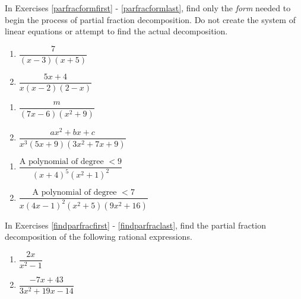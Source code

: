 \label{ExercisesforParFrac}

In Exercises \ref{parfracformfirst} - \ref{parfracformlast},  find only the \emph{form} needed to begin the process of partial fraction decomposition.  Do not create the system of linear equations or attempt to find the actual decomposition.

\begin{multicols}{2}
\begin{enumerate}

\item $\dfrac{7}{(x - 3)(x + 5)}$ \label{parfracformfirst}
\item $\dfrac{5x + 4}{x(x - 2)(2 - x)}$

\setcounter{HW}{\value{enumi}}
\end{enumerate}
\end{multicols}

\begin{multicols}{2}
\begin{enumerate}
\setcounter{enumi}{\value{HW}}


\item $\dfrac{m}{(7x - 6)(x^{2} + 9)}$
\item $\dfrac{ax^{2} + bx + c}{x^3(5x + 9)(3x^{2} + 7x + 9)}$

\setcounter{HW}{\value{enumi}}
\end{enumerate}
\end{multicols}

\begin{multicols}{2}
\begin{enumerate}
\setcounter{enumi}{\value{HW}}

\item $\dfrac{\text{A polynomial of degree } < 9}{(x + 4)^{5}(x^{2} + 1)^{2}}$
\item $\dfrac{\text{A polynomial of degree } < 7}{x(4x - 1)^{2}(x^{2} + 5)(9x^{2} + 16)}$ \label{parfracformlast}

\setcounter{HW}{\value{enumi}}
\end{enumerate}
\end{multicols}


In Exercises \ref{findparfracfirst} - \ref{findparfraclast},  find the partial fraction decomposition of the following rational expressions.

\begin{multicols}{2}
\begin{enumerate}
\setcounter{enumi}{\value{HW}}

\item $\dfrac{2x}{x^{2} - 1}$  \label{findparfracfirst}
\item $\dfrac{-7x + 43}{3x^{2} + 19x - 14}$

\setcounter{HW}{\value{enumi}}
\end{enumerate}
\end{multicols}

